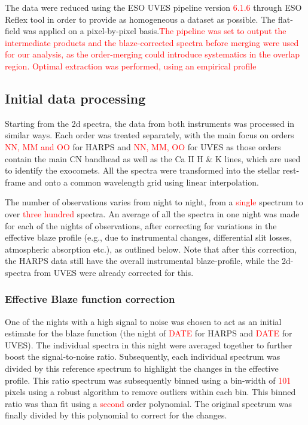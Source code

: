 \documentclass{aa}
\begin{document}
The data were reduced using the ESO \ac{UVES} pipeline version \textcolor{red}{6.1.6} through ESO Reflex tool in order to provide as homogeneous a dataset as possible. The flat-field was applied on a pixel-by-pixel basis.\textcolor{red}{The pipeline was set to output the intermediate products and the blaze-corrected spectra before merging were used for our analysis, as the order-merging could introduce systematics in the overlap region. Optimal extraction was performed, using an empirical profile}

\subsection{Initial data processing}
Starting from the 2d spectra, the data from both instruments was processed in similar ways.
%
Each order was treated separately, with the main focus on orders \textcolor{red}{NN, MM and OO} for HARPS and \textcolor{red}{NN, MM, OO} for UVES as those orders contain the main CN bandhead as well as the Ca II H \& K lines, which are used to identify the exocomets.
%
All the spectra were transformed into the stellar rest-frame and onto a common wavelength grid using linear interpolation. 

The number of observations varies from night to night, from a \textcolor{red}{single} spectrum to over \textcolor{red}{three hundred} spectra.
%
An average of all the spectra in one night was made for each of the nights of observations, after correcting for variations in the effective blaze profile (e.g., due to instrumental changes, differential slit losses, atmospheric absorption etc.), as outlined below. Note that after this correction, the HARPS data still have the overall instrumental blaze-profile, while the 2d-spectra from UVES were already corrected for this.

\subsubsection{Effective Blaze function correction}

One of the nights with a high signal to noise was chosen to act as an initial estimate for the blaze function (the night of \textcolor{red}{DATE} for HARPS and \textcolor{red}{DATE} for UVES). The individual spectra in this night were averaged together to further boost the signal-to-noise ratio. Subsequently, each individual spectrum was divided by this reference spectrum to highlight the changes in the effective profile. This ratio spectrum was subsequently binned using a bin-width of \textcolor{red}{101} pixels using a robust algorithm to remove outliers within each bin. This binned ratio was than fit using a \textcolor{red}{second} order polynomial. The original spectrum was finally divided by this polynomial to correct for the changes.
\end{document}

